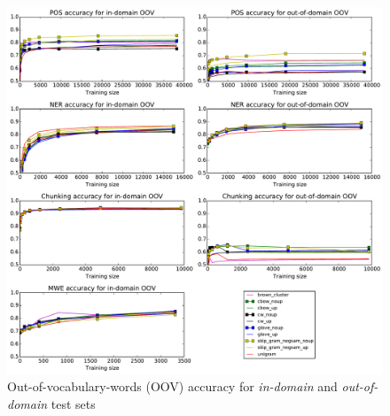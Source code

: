 \begin{figure}
\centering
\caption{Out-of-vocabulary-words (OOV) accuracy for \textit{in-domain} and \textit{out-of-domain} test sets}
\label{OOV} 
    	\includegraphics[scale=0.5]{plots/OOV-plots}
\end{figure}







